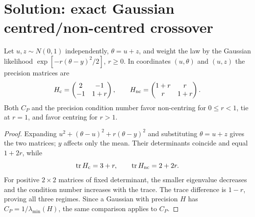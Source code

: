 \documentclass[../main.tex]{subfiles}
\begin{document}

\section*{Solution: exact Gaussian centred/non-centred crossover}

\begin{proposition}
Let $u,z\sim N(0,1)$ independently, $\theta=u+z$, and weight the law by the Gaussian likelihood
$\exp[-r(\theta-y)^2/2]$, $r\ge0$. In coordinates $(u,\theta)$ and $(u,z)$ the precision
matrices are
\[
 H_{\rm c}=\begin{pmatrix}2&-1\\-1&1+r\end{pmatrix},\qquad
 H_{\rm nc}=\begin{pmatrix}1+r&r\\r&1+r\end{pmatrix}.
\]
Both $C_P$ and the precision condition number favor non-centring for $0\le r<1$, tie at $r=1$,
and favor centring for $r>1$.
\end{proposition}

\begin{proof}
Expanding $u^2+(\theta-u)^2+r(\theta-y)^2$ and substituting $\theta=u+z$ gives the two matrices;
$y$ affects only the mean. Their determinants coincide and equal $1+2r$, while
\[
 \operatorname{tr}H_{\rm c}=3+r,\qquad
 \operatorname{tr}H_{\rm nc}=2+2r.
\]
For positive $2\times2$ matrices of fixed determinant, the smaller eigenvalue decreases and the
condition number increases with the trace. The trace difference is $1-r$, proving all three
regimes. Since a Gaussian with precision $H$ has $C_P=1/\lambda_{\min}(H)$, the same comparison
applies to $C_P$.
\end{proof}
\end{document}

